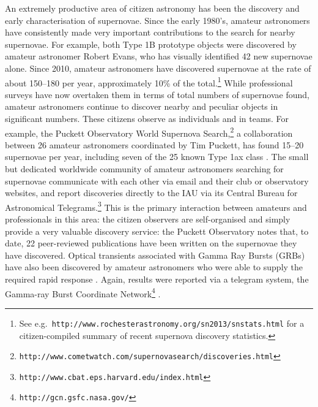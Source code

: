 \documentclass{ar2e}
\def\CaseStudy#1{\noindent{\it\bf #1 \,\,\,\,}}
\def\url#1{\texttt{#1}}
\begin{document}
\CaseStudy{Extragalactic Transients: Supernovae amd GRBs.}
An extremely productive area of citizen astronomy has been the discovery and
early characterisation of supernovae. Since the early 1980's, 
amateur astronomers have consistently made very important contributions to the
search for nearby supernovae. For example, both Type 1B prototype objects
\citep[SN1983N and SN1984L,][]{Porter+Filippenko} were discovered by
amateur astronomer Robert Evans, who has visually identified 42 new supernovae
alone. Since 2010, amateur astronomers have
discovered  supernovae at the rate of about 150--180 per year, approximately
10\% of the total.\footnote{See e.g.\
\url{http://www.rochesterastronomy.org/sn2013/snstats.html} for a
citizen-compiled summary of recent supernova discovery statistics.}  While
professional surveys have now overtaken them in terms of total numbers of
supernovae found,  amateur astronomers continue to discover nearby and peculiar
objects in significant numbers. These citizens observe as individuals and in
teams. For example, the Puckett Observatory World Supernova 
Search,\footnote{\url{http://www.cometwatch.com/supernovasearch/discoveries.html}}
a collaboration between 26 amateur astronomers coordinated by Tim Puckett, has
found 15--20 supernovae per year, including seven of the 25 known Type 1ax class
\citep{Foley2013}. The small but dedicated worldwide community 
of amateur astronomers
searching for supernovae communicate with each other via email and their club or 
observatory websites, and report discoveries directly to the IAU via its Central
Bureau for Astronomical 
Telegrams.\footnote{\url{http://www.cbat.eps.harvard.edu/index.html}} This is
the primary interaction between amateurs and professionals in this area: the
citizen observers are self-organised and simply provide a very valuable
discovery service: the Puckett Observatory notes that, to date, 22 peer-reviewed
publications have been written on the supernovae they have discovered.
Optical transients associated with Gamma Ray Bursts (GRBs) have also been
discovered by amateur astronomers who were 
able to supply the required rapid response
\citep[][]{Oksanen2008}. Again, results were reported via a telegram system, the
Gamma-ray Burst Coordinate Network\footnote{\url{http://gcn.gsfc.nasa.gov/}} 
\citep{Monard2003,Oksanen2007}. 



\end{document}
